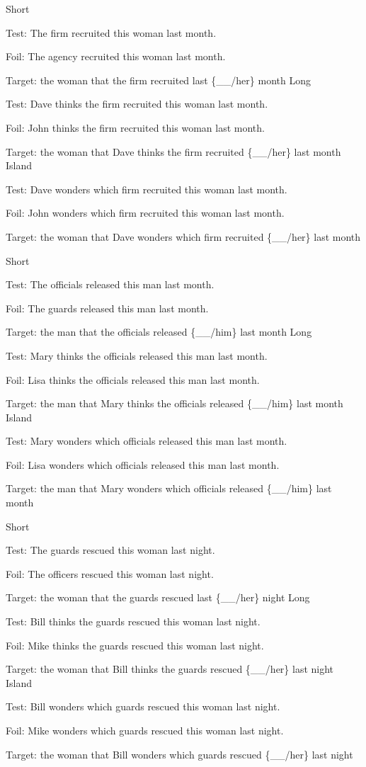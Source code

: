 \pex %
\a Short\par\nobreak
Test: The firm recruited this woman last month.\par\nobreak
Foil: The agency recruited this woman last month.\par\nobreak
Target: the woman that the firm recruited last \{\_\_/her\} month
\a Long\par\nobreak
Test: Dave thinks the firm recruited this woman last month.\par\nobreak
Foil: John thinks the firm recruited this woman last month.\par\nobreak
Target: the woman that Dave thinks the firm recruited \{\_\_/her\} last month
\a Island\par\nobreak
Test: Dave wonders which firm recruited this woman last month.\par\nobreak
Foil: John wonders which firm recruited this woman last month.\par\nobreak
Target: the woman that Dave wonders which firm recruited \{\_\_/her\} last month
\xe

\pex %
\a Short\par\nobreak
Test: The officials released this man last month.\par\nobreak
Foil: The guards released this man last month.\par\nobreak
Target: the man that the officials released \{\_\_/him\} last month
\a Long\par\nobreak
Test: Mary thinks the officials released this man last month.\par\nobreak
Foil: Lisa thinks the officials released this man last month.\par\nobreak
Target: the man that Mary thinks the officials released \{\_\_/him\} last month
\a Island\par\nobreak
Test: Mary wonders which officials released this man last month.\par\nobreak
Foil: Lisa wonders which officials released this man last month.\par\nobreak
Target: the man that Mary wonders which officials released \{\_\_/him\} last month
\xe

\pex %
\a Short\par\nobreak
Test: The guards rescued this woman last night.\par\nobreak
Foil: The officers rescued this woman last night.\par\nobreak
Target: the woman that the guards rescued last \{\_\_/her\} night
\a Long\par\nobreak
Test: Bill thinks the guards rescued this woman last night.\par\nobreak
Foil: Mike thinks the guards rescued this woman last night.\par\nobreak
Target: the woman that Bill thinks the guards rescued \{\_\_/her\} last night
\a Island\par\nobreak
Test: Bill wonders which guards rescued this woman last night.\par\nobreak
Foil: Mike wonders which guards rescued this woman last night.\par\nobreak
Target: the woman that Bill wonders which guards rescued \{\_\_/her\} last night
\xe

